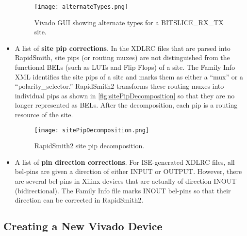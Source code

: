 \begin{itemize}
  \begin{figure}[H]
    \centering
    \texttt{[image: alternateTypes.png]}
    \caption{Vivado GUI showing alternate types for a BITSLICE\_RX\_TX site.}
    \label{fig:alternateTypes}
  \end{figure}
  
  \item A list of \textbf{site pip corrections}. In the XDLRC files that are
  parsed into RapidSmith, site pips (or routing muxes) are not distinguished
  from the functional BELs (such as LUTs and Flip Flops) of a site. The
  Family Info XML identifies the site pips of a site and marks them as either
  a ``mux'' or a ``polarity\_selector.'' RapidSmith2 transforms these routing
  muxes into individual pips as shown in \autoref{fig:sitePipDecomposition} so
  that they are no longer represented as BELs. After the decomposition, each pip
  is a routing resource of the site.
  
  \begin{figure}[H]
    \centering
    \texttt{[image: sitePipDecomposition.png]}
    \caption{RapidSmith2 site pip decomposition.}
    \label{fig:sitePipDecomposition}
  \end{figure}
  
  \item A list of \textbf{pin direction corrections}. For ISE-generated XDLRC
  files, all bel-pins are given a direction of either INPUT or OUTPUT. However,
  there are several bel-pins in Xilinx devices that are actually of direction
  INOUT (bidirectional). The Family Info file marks INOUT bel-pins so that
  their direction can be corrected in RapidSmith2.
  
\end{itemize}

\subsection{Creating a New Vivado Device}